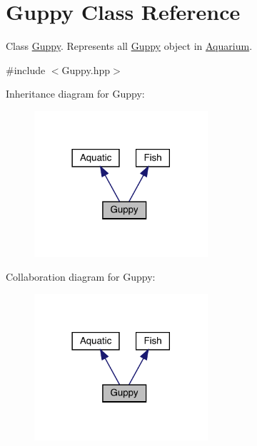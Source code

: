 \hypertarget{class_guppy}{}\section{Guppy Class Reference}
\label{class_guppy}


Class \mbox{\hyperlink{class_guppy}{Guppy}}. Represents all \mbox{\hyperlink{class_guppy}{Guppy}} object in \mbox{\hyperlink{class_aquarium}{Aquarium}}.  




{\ttfamily \#include $<$Guppy.\+hpp$>$}



Inheritance diagram for Guppy\+:\nopagebreak
\begin{figure}[H]
\begin{center}
\leavevmode
\includegraphics[width=182pt]{class_guppy__inherit__graph}
\end{center}
\end{figure}


Collaboration diagram for Guppy\+:\nopagebreak
\begin{figure}[H]
\begin{center}
\leavevmode
\includegraphics[width=182pt]{class_guppy__coll__graph}
\end{center}
\end{figure}
